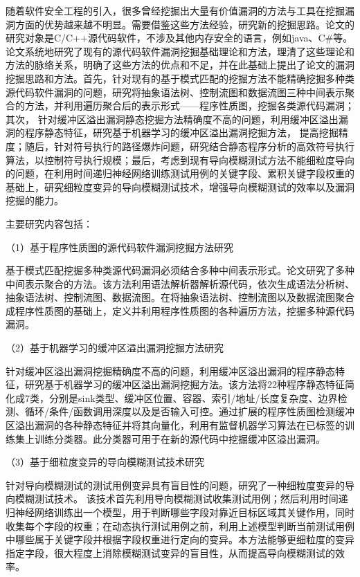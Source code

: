 随着软件安全工程的引入，很多曾经挖掘出大量有价值漏洞的方法与工具在挖掘漏洞方面的优势越来越不明显。需要借鉴这些方法经验，研究新的挖掘思路。论文的研究对象是C/C++源代码软件，不涉及其他内存安全的语言，例如java、C\#等。
论文系统地研究了现有的源代码软件漏洞挖掘基础理论和方法，理清了这些理论和方法的脉络关系，明确了这些方法的优点和不足，并在此基础上提出了论文的漏洞挖掘思路和方法。首先，针对现有的基于模式匹配的挖掘方法不能精确挖掘多种类源代码软件漏洞的问题，研究将抽象语法树、控制流图和数据流图三种中间表示聚合的方法，并利用遍历聚合后的表示形式——程序性质图，挖掘各类源代码漏洞；
其次，
针对缓冲区溢出漏洞静态挖掘方法精确度不高的问题，利用缓冲区溢出漏洞的程序静态特征，研究基于机器学习的缓冲区溢出漏洞挖掘方法，
提高挖掘精度；随后，针对符号执行的路径爆炸问题，研究结合静态程序分析的高效符号执行算法，以控制符号执行规模；最后，考虑到现有导向模糊测试方法不能细粒度导向的问题，在利用时间递归神经网络训练测试用例的关键字段、累积关键字段权重的基础上，研究细粒度变异的导向模糊测试技术，增强导向模糊测试的效率以及漏洞挖掘的能力。

主要研究内容包括：

（1）基于程序性质图的源代码软件漏洞挖掘方法研究

基于模式匹配挖掘多种类源代码漏洞必须结合多种中间表示形式。论文研究了多种中间表示聚合的方法。该方法利用语法解析器解析源代码，依次生成语法分析树、抽象语法树、控制流图、数据流图。在将抽象语法树、控制流图以及数据流图聚合成程序性质图的基础上，定义并利用程序性质图的各种遍历方法，挖掘多种源代码漏洞。

（2）基于机器学习的缓冲区溢出漏洞挖掘方法研究

针对缓冲区溢出漏洞挖掘精确度不高的问题，利用缓冲区溢出漏洞的程序静态特征，研究基于机器学习的缓冲区溢出漏洞挖掘方法。该方法将22种程序静态特征简化成7类，分别是sink类型、缓冲区位置、容器、索引/地址/长度复杂度、边界检测、循环/条件/函数调用深度以及是否输入可控。通过扩展的程序性质图检测缓冲区溢出漏洞的各种静态特征并将其向量化，利用有监督机器学习算法在已标签的训练集上训练分类器。此分类器可用于在新的源代码中挖掘缓冲区溢出漏洞。

（3）基于细粒度变异的导向模糊测试技术研究

针对导向模糊测试的测试用例变异具有盲目性的问题，研究了一种细粒度变异的导向模糊测试技术。
该技术首先利用导向模糊测试收集测试用例；然后利用时间递归神经网络训练出一个模型，用于判断哪些字段对靠近目标区域其关键作用，同时收集每个字段的权重；在动态执行测试用例之前，利用上述模型判断当前测试用例中哪些属于关键字段并根据字段权重进行定向的变异。本方法能够更细粒度的变异指定字段，很大程度上消除模糊测试变异的盲目性，从而提高导向模糊测试的效率。

